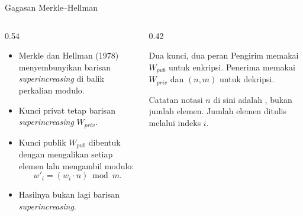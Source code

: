 \documentclass[aspectratio=169,11pt]{beamer}
\begin{document}
\begin{frame}{Gagasan Merkle--Hellman}
    \begin{columns}[T,onlytextwidth]
        \begin{column}{0.54\textwidth}
            \footnotesize
            \begin{itemize}
                \item Merkle dan Hellman (1978) menyembunyikan barisan
                      \textit{superincreasing} di balik perkalian modulo.
                \item Kunci privat tetap barisan \textit{superincreasing}
                      $W_{priv}$.
                \item Kunci publik $W_{pub}$ dibentuk dengan mengalikan setiap
                      elemen lalu mengambil modulo:
                      \[
                          w'_i = (w_i \cdot n) \bmod m.
                      \]
                \item Hasilnya bukan lagi barisan \textit{superincreasing}.
            \end{itemize}
        \end{column}
        \begin{column}{0.42\textwidth}
            \begin{exampleblock}{Dua kunci, dua peran}
                \footnotesize
                Pengirim memakai $W_{pub}$ untuk enkripsi. Penerima memakai
                $W_{priv}$ dan $(n,m)$ untuk dekripsi.
            \end{exampleblock}
            \begin{alertblock}{Catatan notasi}
                \footnotesize
                $n$ di sini adalah , bukan jumlah elemen.
                Jumlah elemen ditulis melalui indeks $i$.
            \end{alertblock}
        \end{column}
    \end{columns}
\end{frame}
\end{document}
